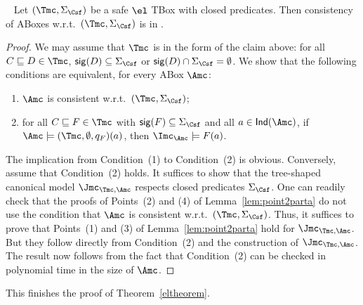 \documentclass{lmcs}
\theoremstyle{definition}
\begin{document}
\begin{lem}~\label{lem:point2partb}
  Let $(\Tmc,\Sigma_\Csf)$ be a safe $\el$ TBox with closed predicates. 
  Then consistency of ABoxes w.r.t.\ $(\Tmc,\Sigma_\Csf)$ is in \ptime.
\end{lem}
\begin{proof}
We may assume that $\Tmc$ is in the form of the claim above: for all $C \sqsubseteq D \in
  \Tmc$, ${\sf sig}(D) \subseteq \Sigma_\Csf$ or ${\sf sig}(D) \cap
  \Sigma_\Csf=\emptyset$. We show that the following conditions are
equivalent, for every ABox $\Amc$:
\begin{enumerate}
\item $\Amc$ is consistent w.r.t.~$(\Tmc,\Sigma_{\Csf})$;
\item for all $C\sqsubseteq F\in \Tmc$ with ${\sf sig}(F)\subseteq \Sigma_\Csf$ and all $a\in {\sf Ind}(\Amc)$, if $\Amc\models (\Tmc,\emptyset,q_{F})(a)$, then
$\Imc_{\Amc}\models F(a)$.
\end{enumerate}
The implication from Condition~(1) to Condition~(2) is obvious. Conversely, assume that Condition~(2) holds.
It suffices to show that the tree-shaped canonical model $\Jmc_{\Tmc,\Amc}$ respects closed predicates $\Sigma_{\Csf}$.
One can readily check that the proofs of Points~(2) and (4) of Lemma~\ref{lem:point2parta} do not use 
the condition that $\Amc$ is consistent
w.r.t.~$(\Tmc,\Sigma_{\Csf})$. Thus, it suffices to prove that Points~(1) and (3) of Lemma~\ref{lem:point2parta}
hold for $\Jmc_{\Tmc,\Amc}$. 
But they follow directly from Condition~(2) and the construction of $\Jmc_{\Tmc,\Amc}$.
The result now follows from the fact that Condition~(2) can be checked in polynomial time in the size of $\Amc$.
\end{proof}
This finishes the proof of Theorem~\ref{eltheorem}.
\end{document}
